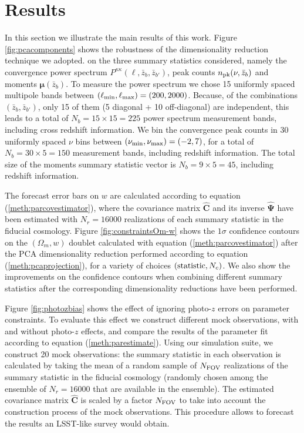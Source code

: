 \documentclass[reprint,aps,prd,superscriptaddress,showkeys,showpacs]{revtex4-1}
\newcommand{\bbh}[1]{\mathbf{\hat{#1}}}
\begin{document}
\section{Results}
In this section we illustrate the main results of this work. Figure \ref{fig:pcacomponents} shows the robustness of the dimensionality reduction technique we adopted. on the three summary statistics considered, namely the convergence power spectrum $P^{\kappa\kappa}(\ell,\bar{z}_b,\bar{z}_{b'})$, peak counts $n_{\rm pk}(\nu,\bar{z}_b)$ and moments $\pmb{\mu}(\bar{z}_b)$. To measure the power spectrum we chose 15 uniformly spaced multipole bands between $(\ell_{\rm min},\ell_{\rm max})=(200,2000)$. Because, of the combinations $(\bar{z}_b,\bar{z}_{b'})$, only 15 of them (5 diagonal + 10 off-diagonal) are independent, this leads to a total of $N_b=15\times 15=225$ power spectrum measurement bands, including cross redshift information. 
We bin the convergence peak counts in 30 uniformly spaced $\nu$ bins between $(\nu_{\rm min},\nu_{\rm max})=(-2,7)$, for a total of $N_b=30\times5=150$ measurement bands, including redshift information. The total size of the moments summary statistic vector is $N_b=9\times 5=45$, including redshift information. 

The forecast error bars on $w$ are calculated according to equation (\ref{meth:parcovestimator}), where the covariance matrix $\bbh{C}$ and its inverse $\bbh{\Psi}$ have been estimated with $N_r=16000$ realizations of each summary statistic in the fiducial cosmology. Figure \ref{fig:constraintsOm-w} shows the $1\sigma$ confidence contours on the $(\Omega_m,w)$ doublet calculated with equation (\ref{meth:parcovestimator}) after the PCA dimensionality reduction performed according to equation (\ref{meth:pcaprojection}), for a variety of choices $({\rm statistic},N_c)$. We also show the improvements on the confidence contours when combining different summary statistics after the corresponding dimensionality reductions have been performed. 

Figure \ref{fig:photozbias} shows the effect of ignoring photo-$z$ errors on parameter constraints. To evaluate this effect we construct different mock observations, with and without photo-$z$ effects, and compare the results of the parameter fit according to equation (\ref{meth:parestimate}). Using our simulation suite, we construct 20 mock observations: the summary statistic in each observation is calculated by taking the mean of a random sample of $N_{\rm FOV}$ realizations of the summary statistic in the fiducial cosmology (randomly chosen among the ensemble of $N_r=16000$ that are available in the ensemble). The estimated covariance matrix $\bbh{C}$ is scaled by a factor $N_{\rm FOV}$ to take into account the construction process of the mock observations. This procedure allows to forecast the results an LSST-like survey would obtain.        
\end{document}

